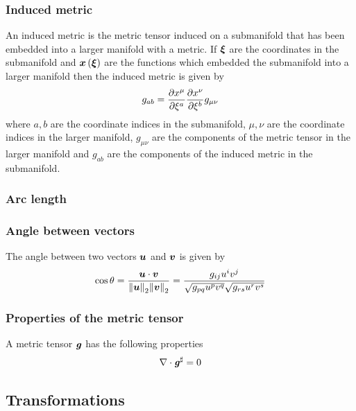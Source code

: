 \subsubsection{Induced metric}

An induced metric is the metric tensor induced on a submanifold that has been
embedded into a larger manifold with a metric. If $ \boldsymbol{\xi} $ are the
coordinates in the submanifold and $  \boldsymbol{x} \left(  \boldsymbol{\xi}  \right) $ are the
functions which embedded the submanifold into a larger manifold then the
induced metric is given by
\begin{equation}
  g_{ab}= \dfrac{\partial x^{\mu}}{\partial \xi^{a}}  \dfrac{\partial x^{\nu}}{\partial \xi^{b}} g_{\mu\nu}
\end{equation}
where $a, b$ are the coordinate indices in the submanifold, $\mu, \nu$ are the
coordinate indices in the larger manifold, $g_{\mu\nu}$ are the components of
the metric tensor in the larger manifold and $g_{ab}$ are the components of
the induced metric in the submanifold.

\subsubsection{Arc length}

\subsubsection{Angle between vectors}

The angle between two vectors $ \boldsymbol{u} $ and $ \boldsymbol{v} $ is given by
\begin{equation}
  \cos\theta=\dfrac{\dotprod{\vectr{u}}{\vectr{v}}}{\norm{\vectr{u}}\norm{\vectr{v}}}=
  \dfrac{g_{ij}u^{i}v^{j}}{\sqrt{g_{pq}u^{p}v^{q}}\sqrt{g_{rs}u^{r}v^{s}}}
  \label{eqn:AngleBetweenVectors}
\end{equation}

\subsubsection{Properties of the metric tensor}

A metric tensor $\boldsymbol{\mathit{g}}$ has the following properties
\begin{align}
  \divergence{}{\sharptensor{\tensor{g}}}=0
  \label{eqn:DivergenceSharpMetricTensor}
\end{align}

\subsection{Transformations}

